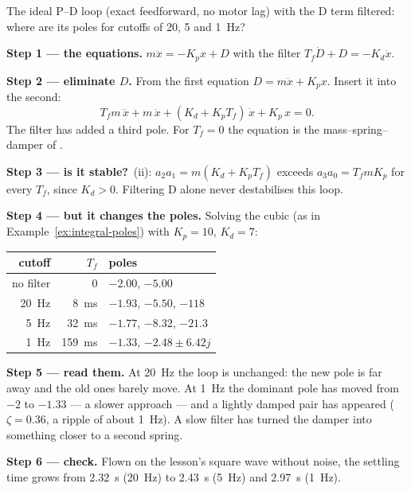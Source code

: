 \begin{example}
\label{ex:noise-delay}
The ideal P–D loop (exact feedforward, no motor lag) with the D term filtered: where are its poles for cutoffs of 20, 5 and \SI{1}{Hz}?

\textbf{Step 1 — the equations.} $m\ddot x = -K_p x + D$ with the filter $T_f\dot D + D = -K_d\dot x$.

\textbf{Step 2 — eliminate $D$.} From the first equation $D = m\ddot x + K_p x$. Insert it into the second:
\begin{equation}\label{eq:noise-cubic}
  T_f m\,\dddot x + m\,\ddot x + (K_d + K_p T_f)\,\dot x + K_p\,x = 0 .
\end{equation}
The filter has added a third pole. For $T_f = 0$ the equation is the mass–spring–damper of .

\textbf{Step 3 — is it stable?} \,(ii): $a_2a_1 = m(K_d + K_pT_f)$ exceeds $a_3a_0 = T_f m K_p$ for every $T_f$, since $K_d > 0$. Filtering D alone never destabilises this loop.

\textbf{Step 4 — but it changes the poles.} Solving the cubic (as in Example~\ref{ex:integral-poles}) with $K_p = 10$, $K_d = 7$:
\begin{center}\small\sffamily
\begin{tabular}{rrl}
\toprule
cutoff & $T_f$ & poles\\
\midrule
no filter & 0 & $-2.00$, $-5.00$\\
\SI{20}{Hz} & \SI{8}{ms} & $-1.93$, $-5.50$, $-118$\\
\SI{5}{Hz} & \SI{32}{ms} & $-1.77$, $-8.32$, $-21.3$\\
\SI{1}{Hz} & \SI{159}{ms} & $-1.33$, $-2.48 \pm 6.42j$\\
\bottomrule
\end{tabular}
\end{center}

\textbf{Step 5 — read them.} At \SI{20}{Hz} the loop is unchanged: the new pole is far away and the old ones barely move. At \SI{1}{Hz} the dominant pole has moved from $-2$ to $-1.33$ — a slower approach — and a lightly damped pair has appeared ($\zeta = 0.36$, a ripple of about \SI{1}{Hz}). A slow filter has turned the damper into something closer to a second spring.

\textbf{Step 6 — check.} Flown on the lesson's square wave without noise, the settling time grows from \SI{2.32}{s} (\SI{20}{Hz}) to \SI{2.43}{s} (\SI{5}{Hz}) and \SI{2.97}{s} (\SI{1}{Hz}).
\end{example}

